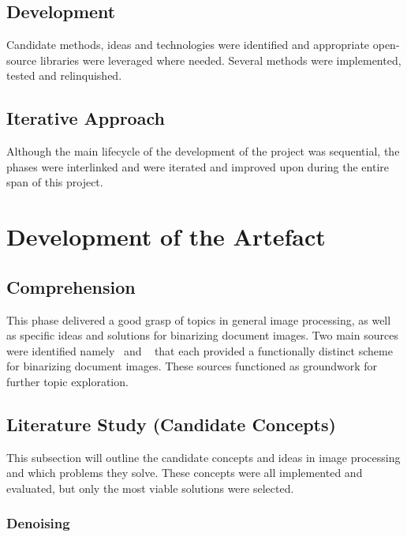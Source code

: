 \documentclass[a4paper, 12pt]{report}
\begin{document}
\subsection{Development}
Candidate methods, ideas and technologies were identified and appropriate open-source libraries were leveraged where needed. Several methods were implemented, tested and relinquished.

\subsection{Iterative Approach}
Although the main lifecycle of the development of the project was sequential, the phases were interlinked and were iterated and improved upon during the entire span of this project.

\newpage

\section{Development of the Artefact}
\subsection{Comprehension}
This phase delivered a good grasp of topics in general image processing, as well as specific ideas and solutions for binarizing document images. Two main sources were identified namely~\cite{su2012robust} and ~\cite{gatos2006adaptive} that each provided a functionally distinct scheme for binarizing document images. These sources functioned as groundwork for further topic exploration.

\subsection{Literature Study (Candidate Concepts)}
This subsection will outline the candidate concepts and ideas in image processing and which problems they solve. These concepts were all implemented and evaluated, but only the most viable solutions were selected.

\subsubsection{Denoising}
\end{document}
